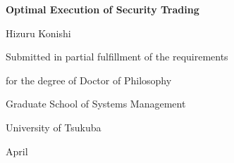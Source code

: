 \documentclass[a4paper,openany]{book}
\begin{document}

\begin{titlepage}

\vspace*{2.0cm}

\begin{center}
{\huge {\bf Optimal Execution of Security Trading}}

\vspace*{2.5cm}

{\huge Hizuru Konishi}

\vspace*{4.5cm}

{\large Submitted in partial fulfillment of the requirements \\

\vspace*{3mm}

for the degree of Doctor of Philosophy}

\vspace*{1.5cm}

{\large
Graduate School of Systems Management \\

\vspace*{3mm}

University of Tsukuba}

\vspace*{1.5cm}

{\large April }

\end{center}

\end{titlepage}

\addtolength{\baselineskip}{0.5\baselineskip}


\newpage

%
%
%
%
%
%
%
%
%
\end{document}
